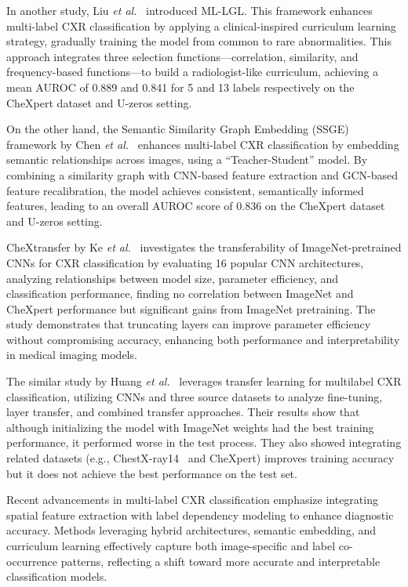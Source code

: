 In another study, Liu \textit{et al.}~\cite{liu2023Global} introduced ML-LGL. This framework enhances multi-label CXR classification by applying a clinical-inspired curriculum learning strategy, gradually training the model from common to rare abnormalities. This approach integrates three selection functions—correlation, similarity, and frequency-based functions—to build a radiologist-like curriculum, achieving a mean AUROC of 0.889 and 0.841 for 5 and 13 labels respectively on the CheXpert dataset and U-zeros setting.

On the other hand, the Semantic Similarity Graph Embedding (SSGE) framework by Chen \textit{et al.}~\cite{chen2022Graph} enhances multi-label CXR classification by embedding semantic relationships across images, using a “Teacher-Student” model. By combining a similarity graph with CNN-based feature extraction and GCN-based feature recalibration, the model achieves consistent, semantically informed features, leading to an overall AUROC score of 0.836 on the CheXpert dataset and U-zeros setting.

CheXtransfer by Ke \textit{et al.}~\cite{ke2021CheXtransfer} investigates the transferability of ImageNet-pretrained CNNs for CXR classification by evaluating 16 popular CNN architectures, analyzing relationships between model size, parameter efficiency, and classification performance, finding no correlation between ImageNet and CheXpert performance but significant gains from ImageNet pretraining. The study demonstrates that truncating layers can improve parameter efficiency without compromising accuracy, enhancing both performance and interpretability in medical imaging models.

The similar study by Huang \textit{et al.}~\cite{huang2022Transfer} leverages transfer learning for multilabel CXR classification, utilizing CNNs and three source datasets to analyze fine-tuning, layer transfer, and combined transfer approaches. Their results show that although initializing the model with ImageNet weights had the best training performance, it performed worse in the test process. They also showed integrating related datasets (e.g., ChestX-ray14~\cite{wang2017ChestX} and CheXpert) improves training accuracy but it does not achieve the best performance on the test set.

Recent advancements in multi-label CXR classification emphasize integrating spatial feature extraction with label dependency modeling to enhance diagnostic accuracy. Methods leveraging hybrid architectures, semantic embedding, and curriculum learning effectively capture both image-specific and label co-occurrence patterns, reflecting a shift toward more accurate and interpretable classification models.

